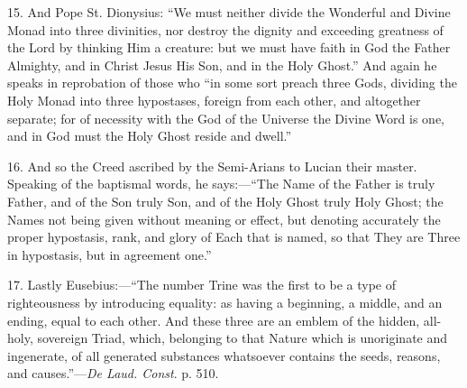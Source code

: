 15. And Pope St. Dionysius: ``We must neither divide the
Wonderful and Divine Monad into three divinities, nor destroy the
dignity and exceeding greatness of the Lord by thinking Him a
creature: but we must have faith in God the Father Almighty, and in
Christ Jesus His Son, and in the Holy Ghost.'' And again he speaks
in reprobation of those who ``in some sort preach three Gods,
dividing the Holy Monad into three hypostases, foreign from each
other, and altogether separate; for of necessity with the God of the
Universe the Divine Word is one, and in God must the Holy Ghost reside
and dwell.''

16. And so the Creed ascribed by the Semi-Arians to Lucian their
master. Speaking of the baptismal words, he says:—``The Name of
the Father is truly Father, and of the Son truly Son, and of the Holy
Ghost truly Holy Ghost; the Names not being given without meaning or
effect, but denoting accurately the proper hypostasis, rank, and
glory of Each that is named, so that They are Three in hypostasis, but
in agreement one.''

17. Lastly Eusebius:—``The number Trine was the first to be a
type of righteousness by introducing equality: as having a beginning, a
middle, and an ending, equal to each other. And these three are an
emblem of the hidden, all-holy, sovereign Triad, which, belonging to
that Nature which is unoriginate and ingenerate, of all generated
substances whatsoever contains the seeds, reasons, and causes.''—\emph{De
Laud. Const}. p. 510.


